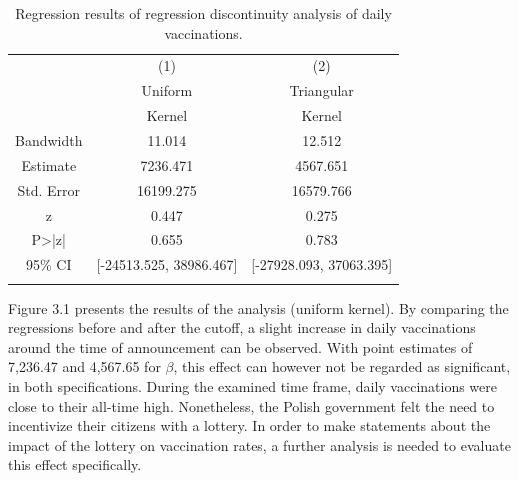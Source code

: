 \documentclass{scrbook}
\begin{document}
\vspace{-1.2cm}
\begin{table}[! htbp]\centering \caption[Results of regression discontinuity analysis of daily vaccinations in Poland]{Regression results of regression discontinuity analysis of daily vaccinations.}
\bigskip
\label{table:weightssynth}
\begin{threeparttable}
\begin{tabular}{c c c}
\toprule
 & (1) & (2)\\
 & Uniform & Triangular\\
 & Kernel & Kernel\\ \midrule
Bandwidth & 11.014 & 12.512\\
Estimate & 7236.471 & 4567.651\\
Std. Error & 16199.275 & 16579.766\\
z & 0.447 & 0.275\\
P>|z| & 0.655 & 0.783\\
95\% CI & [-24513.525, 38986.467] & [-27928.093, 37063.395]\\
\bottomrule\addlinespace[1ex]
\end{tabular}
\end{threeparttable}
\label{table2}
\end{table}

Figure 3.1 presents the results of the analysis (uniform kernel). By
comparing the regressions before and after the cutoff, a slight increase
in daily vaccinations around the time of announcement can be observed.
With point estimates of 7,236.47 and 4,567.65 for \(\beta\), this effect
can however not be regarded as significant, in both specifications.
During the examined time frame, daily vaccinations were close to their
all-time high. Nonetheless, the Polish government felt the need to
incentivize their citizens with a lottery. In order to make statements
about the impact of the lottery on vaccination rates, a further analysis
is needed to evaluate this effect specifically.
\end{document}
